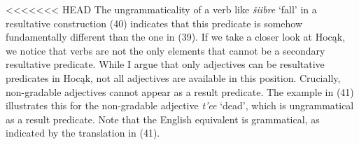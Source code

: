 \documentclass[output=paper]{LSP/langsci}
\begin{document}
\begin{exe}
\begin{exe}
\begin{exe}
\begin{exe}
{\begin{exe}
\begin{exe}
{\begin{exe}



\end{exe}

<<<<<<< HEAD
The ungrammaticality of a verb like \textit{šiibre} `fall' in a resultative construction (40) indicates that this predicate is somehow fundamentally different than the one in (39). If we take a closer look at Hocąk, we notice that verbs are not the only elements that cannot be a secondary resultative predicate. While I argue that only adjectives can be resultative predicates in Hocąk, not all adjectives are available in this position. Crucially, non-gradable adjectives cannot appear as a result predicate. The example in (41) illustrates this for the non-gradable adjective \textit{t'ee} `dead', which is ungrammatical as a result predicate. Note that the English equivalent is grammatical, as indicated by the translation in (41).

\begin{exe}
\end{exe}

}
\end{exe}
\end{exe}}
\end{exe}
\end{exe}
\end{exe}
\end{exe}
\end{document}
